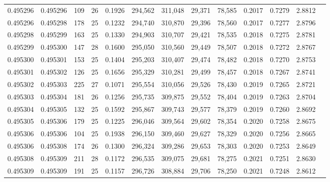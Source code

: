 \begin{tabular}{rrrrrrrrrrrrr}
0.495296 & 0.495296 & 109 &  26 &                                     0.1926 & 294,562 & 311,048 &  29,371 &  78,585 & 0.2017 & 0.7279 & 2.8812 \\
0.495296 & 0.495298 & 178 &  25 &                                     0.1232 & 294,740 & 310,870 &  29,396 &  78,560 & 0.2017 & 0.7277 & 2.8796 \\
0.495298 & 0.495299 & 163 &  25 &                                     0.1330 & 294,903 & 310,707 &  29,421 &  78,535 & 0.2018 & 0.7275 & 2.8781 \\
0.495299 & 0.495300 & 147 &  28 &                                     0.1600 & 295,050 & 310,560 &  29,449 &  78,507 & 0.2018 & 0.7272 & 2.8767 \\
0.495300 & 0.495301 & 153 &  25 &                                     0.1404 & 295,203 & 310,407 &  29,474 &  78,482 & 0.2018 & 0.7270 & 2.8753 \\
0.495301 & 0.495302 & 126 &  25 &                                     0.1656 & 295,329 & 310,281 &  29,499 &  78,457 & 0.2018 & 0.7267 & 2.8741 \\
0.495302 & 0.495303 & 225 &  27 &                                     0.1071 & 295,554 & 310,056 &  29,526 &  78,430 & 0.2019 & 0.7265 & 2.8721 \\
0.495303 & 0.495304 & 181 &  26 &                                     0.1256 & 295,735 & 309,875 &  29,552 &  78,404 & 0.2019 & 0.7263 & 2.8704 \\
0.495304 & 0.495305 & 132 &  25 &                                     0.1592 & 295,867 & 309,743 &  29,577 &  78,379 & 0.2019 & 0.7260 & 2.8692 \\
0.495305 & 0.495306 & 179 &  25 &                                     0.1225 & 296,046 & 309,564 &  29,602 &  78,354 & 0.2020 & 0.7258 & 2.8675 \\
0.495306 & 0.495306 & 104 &  25 &                                     0.1938 & 296,150 & 309,460 &  29,627 &  78,329 & 0.2020 & 0.7256 & 2.8665 \\
0.495306 & 0.495308 & 174 &  26 &                                     0.1300 & 296,324 & 309,286 &  29,653 &  78,303 & 0.2020 & 0.7253 & 2.8649 \\
0.495308 & 0.495309 & 211 &  28 &                                     0.1172 & 296,535 & 309,075 &  29,681 &  78,275 & 0.2021 & 0.7251 & 2.8630 \\
0.495309 & 0.495309 & 191 &  25 &                                     0.1157 & 296,726 & 308,884 &  29,706 &  78,250 & 0.2021 & 0.7248 & 2.8612 \\

\end{tabular}
